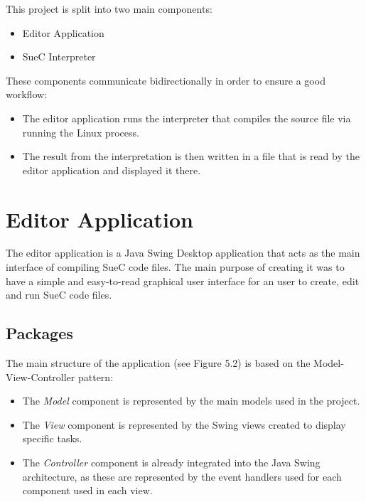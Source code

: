 \documentclass[12pt,a4paper,twoside]{report}
\begin{document}
This project is split into two main components:
\begin{itemize}
	\item Editor Application
	\item SueC Interpreter
\end{itemize}

These components communicate bidirectionally in order to ensure a good workflow:
\begin{itemize}
	\item The editor application runs the interpreter that compiles the source file via running the Linux process.
	\item The result from the interpretation is then written in a file that is read by the editor application and displayed it there.  
\end{itemize}


\section{Editor Application}
The editor application is a Java Swing Desktop application that acts as the main interface of compiling SueC code files. The main purpose of creating it was to have a simple and easy-to-read graphical user interface for an user to create, edit and run SueC code files.
\subsection{Packages}

The main structure of the application (see Figure 5.2) is based on the Model-View-Controller pattern:
\begin{itemize}
 \item The \textit{Model} component is represented by the main models used in the project.
 \item The \textit{View} component is represented by the Swing views created to display specific tasks.
 \item The \textit{Controller} component is already integrated into the Java Swing architecture, as these are represented by the event handlers used for each component used in each view.
\end{itemize}
\end{document}
